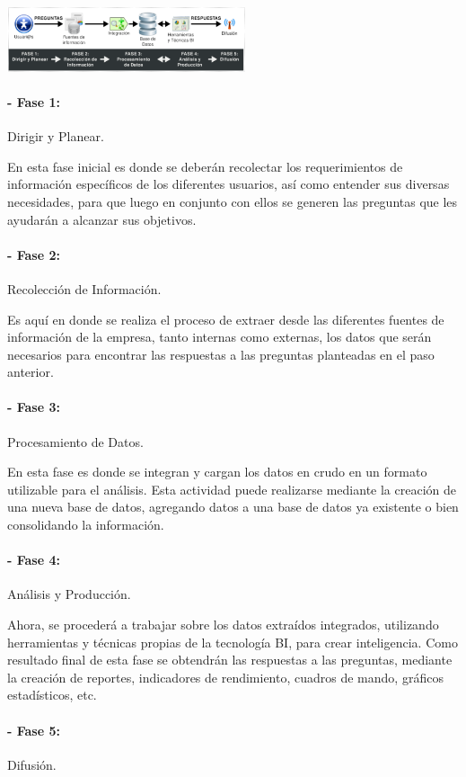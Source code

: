 \documentclass[twoside,twocolumn]{article}
\begin{document}
\includegraphics[width=7cm]{imagenes/img1.PNG}

\paragraph{- Fase 1: }

Dirigir y Planear.

En esta fase inicial es donde se deberán recolectar los requerimientos de información específicos de los diferentes 
usuarios, así como entender sus diversas necesidades, para que luego 
en conjunto con ellos se generen las preguntas que les ayudarán a 
alcanzar sus objetivos. 

\paragraph{- Fase 2:}
Recolección de Información.

Es aquí en donde se realiza el proceso de extraer desde las diferentes fuentes de información de la 
empresa, tanto internas como externas, los datos que serán necesarios 
para encontrar las respuestas a las preguntas planteadas en el paso 
anterior. 
\paragraph{- Fase 3:}
Procesamiento de Datos.

En esta fase es donde se integran y 
cargan los datos en crudo en un formato utilizable para el análisis. Esta 
actividad puede realizarse mediante la creación de una nueva base de 
datos, agregando datos a una base de datos ya existente o bien 
consolidando la información. 

\paragraph{- Fase 4:}
Análisis y Producción.

Ahora, se procederá a trabajar sobre 
los datos extraídos integrados, utilizando herramientas y técnicas propias 
de la tecnología BI, para crear inteligencia. Como resultado final de esta 
fase se obtendrán las respuestas a las preguntas, mediante la creación 
de reportes, indicadores de rendimiento, cuadros de mando, gráficos 
estadísticos, etc. 
\paragraph{- Fase 5:}
Difusión.
\end{document}
